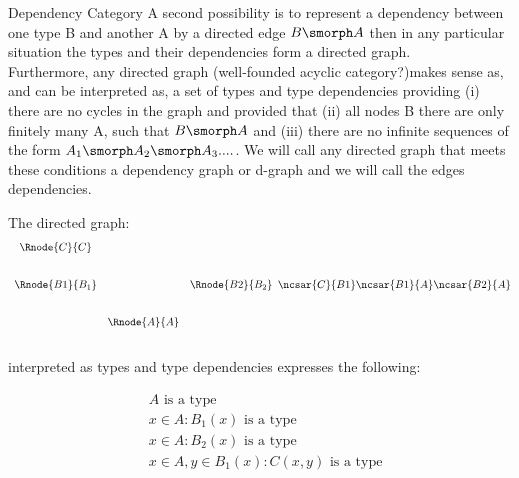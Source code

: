 

\begin{frame}{Dependency Category}
\noindent A second possibility is to represent a dependency between one type B and another A by a directed 
edge $B \smorph A$ then in any particular 
situation the types and their dependencies form a directed graph.
\\

\noindent Furthermore, any directed graph (well-founded acyclic category?)makes sense as, and can be interpreted as, a set of types and type dependencies 
providing (i) there are no cycles in
the graph and provided that (ii) all nodes B there are only finitely many A, such that $B \smorph A$ and (iii) there are 
no infinite sequences of the form $A_1 \smorph A_2 \smorph A_3 ....$. We will call any directed graph that 
meets these conditions a dependency graph or  d-graph and we will call the edges dependencies. 
\end{frame}

\begin{frame} The directed graph:
\begin{equation}
\begin{array}{ccc}
\Rnode{C}{C}   &            &                 \\ [0.8cm]
\Rnode{B1}{B_1}&            &\Rnode{B2}{B_2}  \\ [0.8cm]
               &\Rnode{A}{A}&                 
\end{array}
\ncsar{C}{B1}
\ncsar{B1}{A}
\ncsar{B2}{A} 
\end{equation}
\\

\noindent interpreted as types and type dependencies expresses the following:
\addtocounter{equation}{-1}
\begin{subequations}
\begin{align}
&A\mbox{ is a type} \\
&x\in A : B_1(x) \mbox{ is a type} \\
&x\in A : B_2(x) \mbox{ is a type} \\
&x\in A, y\in B_1(x): C(x,y) \mbox{ is a type}
\end{align}
\end{subequations}

\end{frame}


